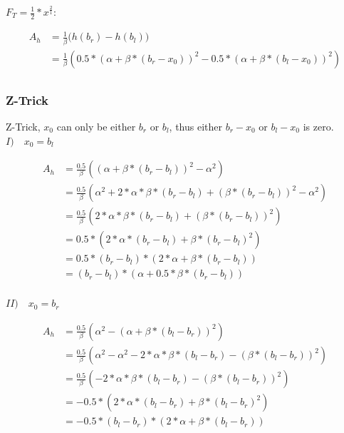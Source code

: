 \documentclass[]{article}
\begin{document}
 $F_T = \frac{1}{2} * x^{\frac{2}{1}}$:

\begin{align*}
A_h &= \frac{1}{\beta} \big(h(b_r) - h(b_l) \big) \\
&= \frac{1}{\beta} \left(0.5 * (\alpha + \beta * (b_r - x_0))^2 - 0.5 * (\alpha + \beta * (b_l - x_0))^2 \right) \\
\end{align*}

\subsubsection{Z-Trick}

Z-Trick, $x_0$ can only be either $b_r$ or $b_l$, thus either $b_r - x_0$ or $b_l - x_0$ is zero. \\

\textbf{$I) \quad x_0 = b_l$}

\begin{align*}
A_h &= \frac{0.5}{\beta} \left( (\alpha + \beta * (b_r - b_l))^2 - \alpha^2  \right) \\
&= \frac{0.5}{\beta} \left( \alpha^2 + 2 * \alpha * \beta * (b_r - b_l) + (\beta * (b_r - b_l))^2 - \alpha^2  \right) \\
&= \frac{0.5}{\beta} \left( 2 * \alpha * \beta * (b_r - b_l) + (\beta * (b_r - b_l))^2 \right) \\
&= 0.5 * \left( 2 * \alpha * (b_r - b_l) + \beta * (b_r - b_l)^2 \right) \\
&= 0.5 * (b_r - b_l) * \left( 2 * \alpha  + \beta * (b_r - b_l) \right) \\
&= (b_r - b_l) * \left(\alpha  + 0.5 * \beta * (b_r - b_l) \right) \\
\end{align*}

\textbf{$II) \quad x_0 = b_r$}

\begin{align*}
A_h &= \frac{0.5}{\beta} \left( \alpha^2 - (\alpha + \beta * (b_l - b_r))^2 \right) \\
&= \frac{0.5}{\beta} \left( \alpha^2 - \alpha^2 - 2 * \alpha * \beta * (b_l - b_r) - (\beta * (b_l - b_r))^2   \right) \\
&= \frac{0.5}{\beta} \left( - 2 * \alpha * \beta * (b_l - b_r) - (\beta * (b_l - b_r))^2 \right) \\
&= -0.5 * \left( 2 * \alpha * (b_l - b_r) + \beta * (b_l - b_r)^2 \right) \\
&= -0.5 * (b_l - b_r) * \left( 2 * \alpha  + \beta * (b_l - b_r) \right) \\
\end{align*}
\end{document}
